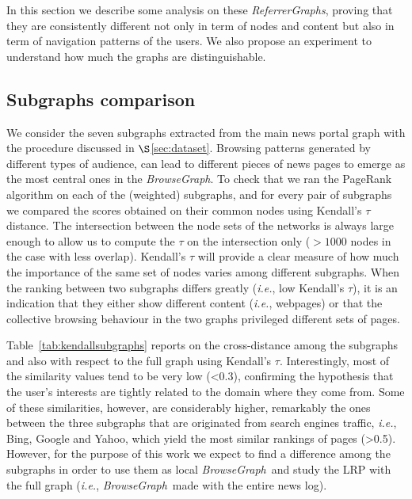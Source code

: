 \documentclass{sig-alternate-2013}
\newcommand{\ie}{\emph{i.e.}}
\newcommand{\browsegraph}{\textit{BrowseGraph}}
\newcommand{\rgraphs}{\textit{ReferrerGraphs}}
\newcommand{\bgraph}{\textit{BrowseGraph}}
\begin{document}
%
%
In this section we describe some analysis on these \rgraphs, proving that they are consistently different not only in term of nodes and content
but also in term of navigation patterns of the users. We also propose an experiment to understand how much the graphs are distinguishable.
\vspace{.4cm}

\subsection{Subgraphs comparison} \label{sec:analysis:pagerank} 
We consider the seven subgraphs extracted from the main news portal graph with the procedure discussed in $\S$\ref{sec:dataset}. 
Browsing patterns generated by different types of audience, can lead to different pieces of news pages to emerge as the most central ones in the \browsegraph. 
To check that we ran the PageRank algorithm on each of the (weighted) subgraphs, and for every pair of subgraphs we compared the scores obtained on their common nodes using Kendall's $\tau$ distance. 
The intersection between the node sets of the networks is always large enough to allow us to compute the $\tau$ on the intersection only ($>1000$ nodes in the case with less overlap). Kendall's $\tau$ will provide a clear
measure of how much the importance of the same set of nodes varies among different subgraphs. 
When the ranking between two subgraphs differs greatly (\ie, low Kendall's $\tau$), it is an indication that they either show different content (\ie, webpages) or that the collective browsing behaviour in the two graphs privileged different sets of pages.

% 
Table~\ref{tab:kendallsubgraphs} reports on the cross-distance among the
subgraphs and also with respect to the full graph using Kendall's $\tau$.
Interestingly, most of the similarity values tend to be very low (<0.3),
confirming the hypothesis that the user's interests are tightly related to the
domain where they come from. Some of these similarities, however, are
considerably higher, remarkably the ones between the three subgraphs that are
originated from search engines traffic, \ie, Bing, Google and Yahoo, which yield
the most similar rankings of pages (>0.5).
% 
However, for the purpose of this work we expect to find a difference among the subgraphs in order to use them as local \bgraph\ and study the LRP with the full graph (\ie, \bgraph\ made with the entire news log).
\end{document}

